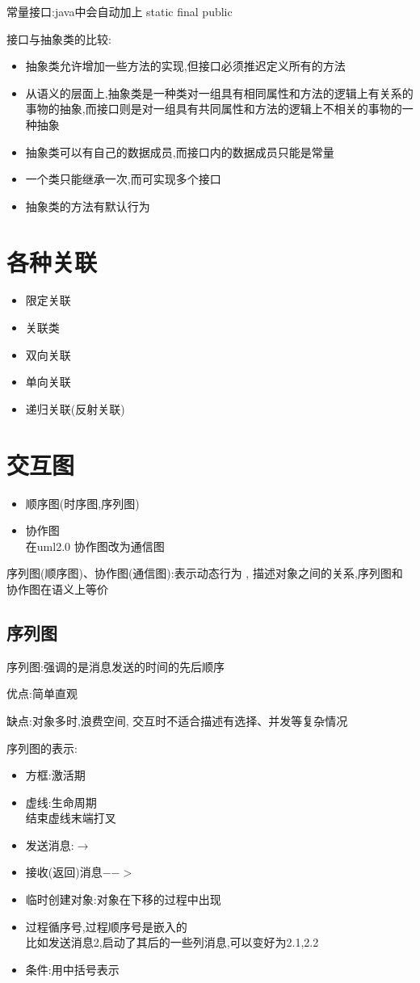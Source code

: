 \documentclass[UTF8,a4paper]{ctexart}
\begin{document}
常量接口:java中会自动加上 static final public

接口与抽象类的比较:
\begin{itemize}
  \item 抽象类允许增加一些方法的实现,但接口必须推迟定义所有的方法
  \item 从语义的层面上,抽象类是一种类对一组具有相同属性和方法的逻辑上有关系的事物的抽象,而接口则是对一组具有共同属性和方法的逻辑上不相关的事物的一种抽象
  \item 抽象类可以有自己的数据成员,而接口内的数据成员只能是常量
  \item 一个类只能继承一次,而可实现多个接口
  \item 抽象类的方法有默认行为
\end{itemize}

\section{各种关联}
\begin{itemize}
  \item 限定关联
  \item 关联类
  \item 双向关联
  \item 单向关联
  \item 递归关联(反射关联)
\end{itemize}

\section{交互图}
\begin{itemize}
  \item 顺序图(时序图,序列图)
  \item 协作图\\
  在uml2.0 协作图改为通信图
\end{itemize}
序列图(顺序图)、协作图(通信图):表示动态行为 , 描述对象之间的关系,序列图和协作图在语义上等价


\subsection{序列图}
序列图:强调的是消息发送的时间的先后顺序

优点:简单直观

缺点:对象多时,浪费空间, 交互时不适合描述有选择、并发等复杂情况

序列图的表示:
\begin{itemize}
  \item 方框:激活期
  \item 虚线:生命周期\\
  结束虚线末端打叉
  \item 发送消息:$\to$
  \item 接收(返回)消息$-->$
  \item 临时创建对象:对象在下移的过程中出现
  \item 过程循序号,过程顺序号是嵌入的\\
  比如发送消息2,启动了其后的一些列消息,可以变好为2.1,2.2
  \item 条件:用中括号表示
\end{itemize}
\end{document}
